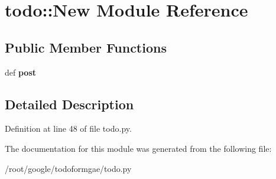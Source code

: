 \hypertarget{moduletodo_1_1_new}{
\section{todo::New Module Reference}
\label{moduletodo_1_1_new}
}
\subsection*{Public Member Functions}
\begin{DoxyCompactItemize}
\item 
\hypertarget{moduletodo_1_1_new_a26abc668735b2ff0598f4bb18ed140d6}{
def {\bfseries post}}
\label{moduletodo_1_1_new_a26abc668735b2ff0598f4bb18ed140d6}

\end{DoxyCompactItemize}


\subsection{Detailed Description}


Definition at line 48 of file todo.py.

The documentation for this module was generated from the following file:\begin{DoxyCompactItemize}
\item 
/root/google/todoformgae/todo.py\end{DoxyCompactItemize}
